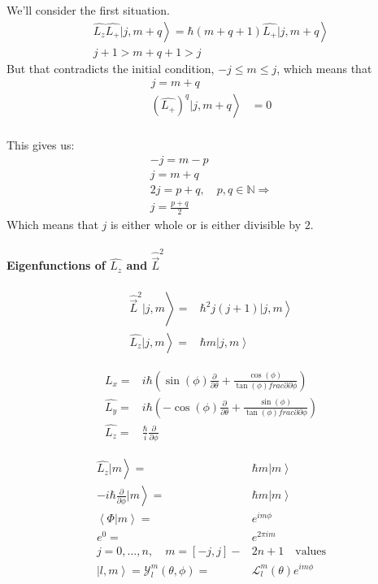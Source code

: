 				We'll consider the first situation.
				\begin{align}
					\left. \hat{L_z}\hat{L_+} | j,m+q \right\rangle	 = \left. \hbar(m+q+1) \hat{L_+}| j,m+q \right\rangle \\
					j + 1 > m+q+1 > j
				\end{align}
				But that contradicts the initial condition, $-j \leq m \leq j$, which means that
				\begin{align}
					j = m + q& \\ 
					\left. \left(\hat{L_+}\right)^q | j,m+q \right\rangle &= 0 \\
				\end{align}
				
		This gives us:
		\begin{align}
			-j = m - p \\
			j = m + q \\
			2j = p + q, \quad p,q \in \mathds{N} \Rightarrow \\
			j = \frac{p + q}{2}
		\end{align}
		Which means that $j$ is either whole or is either divisible by $2$.
		
		\paragraph{Eigenfunctions of $\hat{L_z}$ and $\hat{\vec{L}}^2$}
			
			\begin{align}
				\left. \hat{\vec{L}}^2|j,m\right\rangle =& \left. \hbar^2 j(j+1)|j,m\right\rangle\\
				\left. \hat{L_z}|j,m\right\rangle =& \left. \hbar m|j,m\right\rangle
			\end{align}
			
			\begin{align}
				\hat{L_x} =& i \hbar \left( \sin(\phi)\frac{\partial}{\partial \theta} + \frac{\cos(\phi)}{\tan(\phi)frac{\partial}{\partial \phi}} \right) \\
				\hat{L_y} =& i \hbar \left( - \cos(\phi)\frac{\partial}{\partial \theta} + \frac{\sin(\phi)}{\tan(\phi)frac{\partial}{\partial \phi}} \right)	\\
				\hat{L_z} =& \frac{\hbar}{i} \frac{\partial}{\partial \phi}
			\end{align}
			
			\begin{align}
				\left.\hat{L_z}| m \right\rangle =& \left. \hbar m | m \right\rangle \\
				\left.-i\hbar \frac{\partial}{\partial \phi}| m \right\rangle =& \left. \hbar m | m \right\rangle \\
				\left\langle \Phi | m \right\rangle =& e^{im\phi} \\
				e^{0} =& e^{2\pi i m} \\
				j = 0, ..., n, \quad m = \left[-j, j\right] -& 2n+1 \quad\text{values} \\
				\left. |l,m\right\rangle = \mathcal{Y}_l^m(\theta, \phi) =& \mathcal{L}_l^m(\theta)e^{im\phi}
			\end{align}
			
